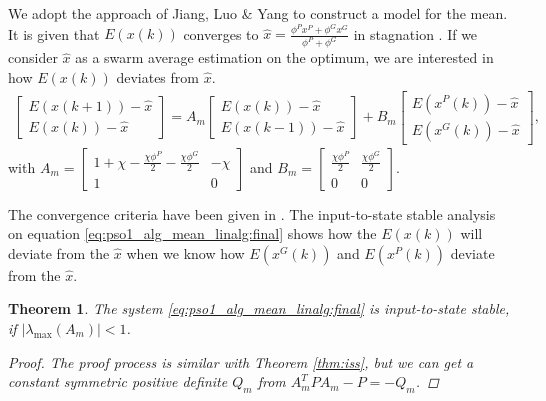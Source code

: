 \documentclass{sig-alternate}
\newtheorem{mythm}{Theorem}
\begin{document}
We adopt the approach of Jiang, Luo \& Yang to construct a model for the mean.
It is given that $ E( x(k) ) $ converges to $ \hat{x} = \frac{\phi^{P} x^{P} + \phi^{G} x^{G} }{ \phi^{P} + \phi^{G} } $ in stagnation \cite{Jiang20078}.
If we consider $ \hat{x} $ as a swarm average estimation on the optimum, we are interested in how $ E( x(k) ) $ deviates from $ \hat{x} $.
\begin{equation}
\label{eq:pso1_alg_mean_linalg:final}
\begin{aligned}
\begin{bmatrix}
E( x(k+1) ) - \hat{x} \\
E( x(k) ) - \hat{x}
\end{bmatrix}
= 
A_{m}
\begin{bmatrix}
E( x(k) ) - \hat{x} \\
E( x(k-1) ) - \hat{x}
\end{bmatrix}
+
B_{m}
\begin{bmatrix}
E( x^{P}(k) ) - \hat{x}\\
E( x^{G}(k) ) - \hat{x}
\end{bmatrix},
\end{aligned}
\end{equation}
with $ A_{m} = \begin{bmatrix}
1 + \chi - \frac{ \chi \phi^{P} }{2} - \frac{ \chi \phi^{G} }{2} & -\chi \\
1 & 0
\end{bmatrix} $
and $ B_{m} = \begin{bmatrix}
\frac{ \chi \phi^{P} }{2} & \frac{ \chi \phi^{G} }{2} \\
0 & 0
\end{bmatrix} $.

The convergence criteria have been given in \cite{Jiang20078}.
The input-to-state stable analysis on equation \eqref{eq:pso1_alg_mean_linalg:final} shows how the $ E(x(k)) $ will deviate from the $ \hat{x} $ when we know how $ E( x^{G}(k) ) $ and $ E( x^{P}(k) ) $ deviate from the $ \hat{x} $.

\begin{mythm}
\label{thm:iss:mean}
	The system \eqref{eq:pso1_alg_mean_linalg:final} is input-to-state stable, if $ | \lambda_{\max} ( A_{m} ) | < 1 $.
	\begin{proof}
		The proof process is similar with Theorem \ref{thm:iss}, but we can get a constant symmetric positive definite $ Q_{m} $ from $ A_{m}^{T} P A_{m} - P = - Q_{m} $.
	\end{proof}
\end{mythm}
\end{document}
